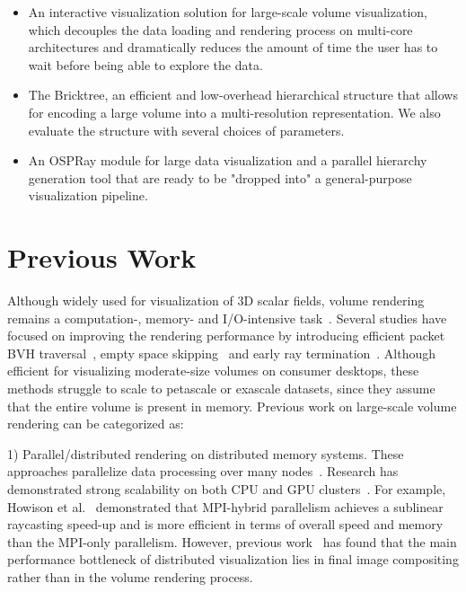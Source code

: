 \begin{itemize}
\item An interactive visualization solution for large-scale volume
visualization, which decouples the data loading and rendering process 
on multi-core architectures and dramatically reduces the amount of time the user has to
wait before being able to explore the data. 
\item The Bricktree, an efficient and low-overhead hierarchical structure that
allows for encoding a large volume into a multi-resolution representation.
We also evaluate the structure with several choices of parameters. 
\item An OSPRay module for large data visualization
and a parallel hierarchy generation tool that are ready to be 
"dropped into" a general-purpose visualization pipeline.  
\end{itemize}



\section{Previous Work}

Although widely used for visualization of 3D scalar fields, volume rendering
remains a computation-, memory- and I/O-intensive task~\cite{wu2018visit}. 
Several studies have focused on improving the rendering performance by
introducing efficient packet BVH traversal~\cite{knoll2011full,wald2017ospray}, 
empty space skipping~\cite{hadwiger2018sparseleap} and
early ray termination~\cite{levoy1990efficient,kruger2003acceleration}.
Although efficient for visualizing moderate-size volumes on consumer desktops, 
these methods struggle to scale to petascale or exascale datasets, since they assume that the entire volume is present in memory. 
Previous work on large-scale volume rendering
can be categorized as: 

1) Parallel/distributed rendering on distributed memory systems. These approaches
parallelize data processing over many nodes~\cite{childs2010extreme}. Research
has demonstrated strong scalability on both CPU and GPU clusters~\cite{childs2006scalable,
howison2012hybrid,peterka2008parallel,eilemann2009equalizer,fogal2010large,beyer2011distributed}. 
For example, Howison et al.~\cite{howison2012hybrid} demonstrated that MPI-hybrid
parallelism achieves a sublinear raycasting speed-up and is more efficient in terms of
overall speed and memory than the MPI-only parallelism.
However, previous work~\cite{wu2018visit} has found that the main
performance bottleneck of distributed visualization lies in final image compositing
rather than in the volume rendering process.

